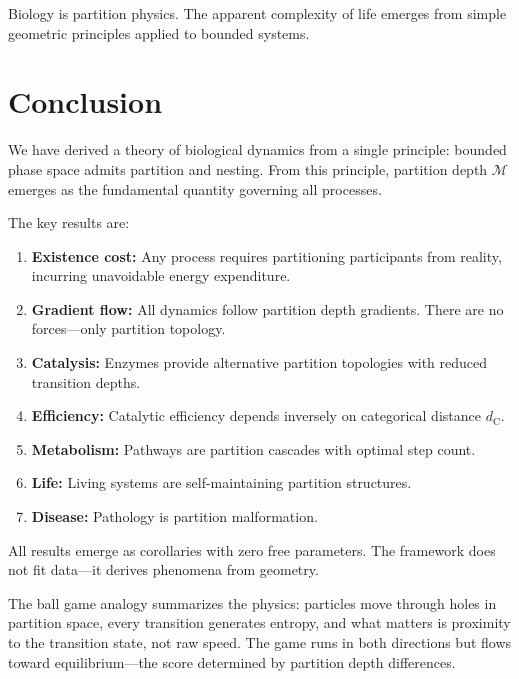﻿\documentclass[twocolumn,10pt,a4paper]{article}
\theoremstyle{definition}
\theoremstyle{remark}
\newcommand{\Depth}{\mathcal{M}}
\newcommand{\dC}{d_{\mathrm{C}}}
\begin{document}
Biology is partition physics. The apparent complexity of life emerges from simple geometric principles applied to bounded systems.

\section{Conclusion}
\label{sec:conclusion}

We have derived a theory of biological dynamics from a single principle: bounded phase space admits partition and nesting. From this principle, partition depth $\Depth$ emerges as the fundamental quantity governing all processes.

The key results are:

\begin{enumerate}
    \item \textbf{Existence cost:} Any process requires partitioning participants from reality, incurring unavoidable energy expenditure.

    \item \textbf{Gradient flow:} All dynamics follow partition depth gradients. There are no forces---only partition topology.

    \item \textbf{Catalysis:} Enzymes provide alternative partition topologies with reduced transition depths.

    \item \textbf{Efficiency:} Catalytic efficiency depends inversely on categorical distance $\dC$.

    \item \textbf{Metabolism:} Pathways are partition cascades with optimal step count.

    \item \textbf{Life:} Living systems are self-maintaining partition structures.

    \item \textbf{Disease:} Pathology is partition malformation.
\end{enumerate}

All results emerge as corollaries with zero free parameters. The framework does not fit data---it derives phenomena from geometry.

The ball game analogy summarizes the physics: particles move through holes in partition space, every transition generates entropy, and what matters is proximity to the transition state, not raw speed. The game runs in both directions but flows toward equilibrium---the score determined by partition depth differences.
\end{document}
